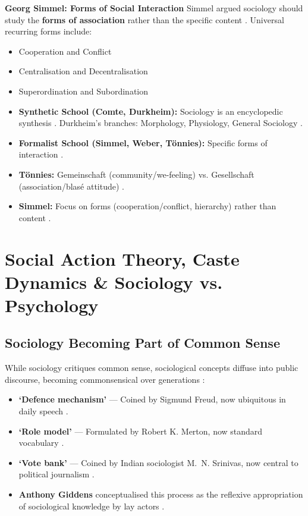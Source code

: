 \begin{KeyConcept}
\textbf{Georg Simmel: Forms of Social Interaction}
Simmel argued sociology should study the \textbf{forms of association} rather than the specific content . Universal recurring forms include:
\begin{itemize}
    \item Cooperation and Conflict 
    \item Centralisation and Decentralisation 
    \item Superordination and Subordination 
\end{itemize}
\end{KeyConcept}

\begin{QuickRevision}
\begin{itemize}
    \item \textbf{Synthetic School (Comte, Durkheim):} Sociology is an encyclopedic synthesis . Durkheim's branches: Morphology, Physiology, General Sociology .
    \item \textbf{Formalist School (Simmel, Weber, Tönnies):} Specific forms of interaction .
    \item \textbf{Tönnies:} Gemeinschaft (community/we-feeling) vs. Gesellschaft (association/blasé attitude) .
    \item \textbf{Simmel:} Focus on forms (cooperation/conflict, hierarchy) rather than content .
\end{itemize}
\end{QuickRevision}

\sectiondivider

\section{Social Action Theory, Caste Dynamics \& Sociology vs. Psychology}

\subsection{Sociology Becoming Part of Common Sense}

\begin{CriticalPoint}
While sociology critiques common sense, sociological concepts diffuse into public discourse, becoming commonsensical over generations :
\begin{itemize}
    \item \textbf{`Defence mechanism'} --- Coined by Sigmund Freud, now ubiquitous in daily speech .
    \item \textbf{`Role model'} --- Formulated by Robert K. Merton, now standard vocabulary .
    \item \textbf{`Vote bank'} --- Coined by Indian sociologist M.~N. Srinivas, now central to political journalism .
    \item \textbf{Anthony Giddens} conceptualised this process as the reflexive appropriation of sociological knowledge by lay actors .
\end{itemize}
\end{CriticalPoint}

